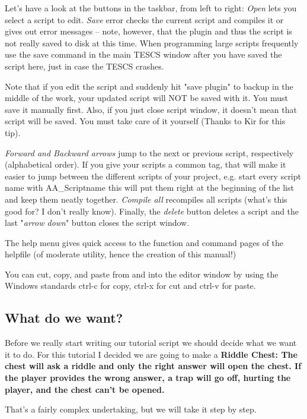 Let's have a look at the buttons in the taskbar, from left to right: \emph{Open} lets you select a script to edit. \emph{Save} error checks the current script and compiles it or gives out error messages -- note, however, that the plugin and thus the script is not really saved to disk at this time. When programming large scripts frequently use the save command in the main TESCS window after you have saved the script here, just in case the TESCS crashes.

Note that if you edit the script and suddenly hit "save plugin" to backup in the middle of the work, your updated script will NOT be saved with it. You must save it manually first. Also, if you just close script window, it doesn't mean that script will be saved. You must take care of it yourself (Thanks to Kir for this tip).

\emph{Forward and Backward arrows} jump to the next or previous script, respectively (alphabetical order). If you give your scripts a common tag, that will make it easier to jump between the different scripts of your project, e.g. start every script name with AA\_Scriptname this will put them right at the beginning of the list and keep them neatly together. \emph{Compile all} recompiles all scripts (what's this good for? I don't really know). Finally, the \emph{delete} button deletes a script and the last "\emph{arrow down}" button closes the script window.

The help menu gives quick access to the function and command pages of the helpfile (of moderate utility, hence the creation of this manual!)

You can cut, copy, and paste from and into the editor window by using the Windows standards ctrl-c for copy, ctrl-x for cut and ctrl-v for paste.

\hypertarget{what-do-we-want}{%
\subsection{What do we want?}\label{what-do-we-want}}

Before we really start writing our tutorial script we should decide what we want it to do. For this tutorial I decided we are going to make a \textbf{Riddle Chest: The chest will ask a riddle and only the right answer will open the chest. If the player provides the wrong answer, a trap will go off, hurting the player, and the chest can't be opened.}

That's a fairly complex undertaking, but we will take it step by step.

